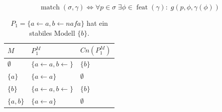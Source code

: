 $$\operatorname{match}(\sigma, \gamma) \Leftrightarrow \forall p \in \sigma \; \exists \phi \in \operatorname{feat}(\gamma): \; g(p, \phi, \gamma(\phi))$$


\begin{table}
    \centering
        \begin{tabularx}{0.5\textwidth}{l|X|l}
            $M$             & $P_1^M$                               & $Cn(P_1^M)$  \\
            \hline
            $\emptyset$     & $\{ a \leftarrow a, b \leftarrow \}$  & $\{ b \}$     \\
            $\{ a \}$       & $\{ a \leftarrow a \}$                & $\emptyset$   \\
            $\{ b \}$       & $\{ a \leftarrow a, b \leftarrow \}$  & $\{ b \}$     \\
            $\{ a, b \}$    & $\{ a \leftarrow a \}$                & $\emptyset$   \\
        \end{tabularx}
    \caption[$P_1 = \{ a \leftarrow a, b \leftarrow naf a \}$ hat ein stabiles Modell.]{$P_1 = \{ a \leftarrow a, b \leftarrow naf a \}$ hat ein stabiles Modell $\{ b \}$.}
    \label{tab:Ein_stabiles_Modell}
\end{table}



